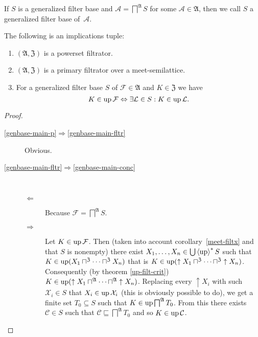 \begin{defn}
If $S$ is a generalized filter base and $\mathcal{A}=\bigsqcap^{\mathfrak{A}}S$
for some $\mathcal{A}\in\mathfrak{A}$, then we call $S$ a generalized
filter base of~$\mathcal{A}$.\end{defn}
\begin{thm}
\label{genbase-main}The following is an implications tuple:
\begin{enumerate}
\item \label{genbase-main-p}$(\mathfrak{A},\mathfrak{Z})$ is a powerset
filtrator.
\item \label{genbase-main-fltr}$(\mathfrak{A},\mathfrak{Z})$ is a primary
filtrator over a meet-semilattice.
\item \label{genbase-main-conc}For a generalized filter base $S$ of $\mathcal{F}\in\mathfrak{A}$
and $K\in\mathfrak{Z}$ we have
\[
K\in\operatorname{up}\mathcal{F}\Leftrightarrow\exists\mathcal{L}\in S:K\in\operatorname{up}\mathcal{L}.
\]

\end{enumerate}
\end{thm}
\begin{proof}
~
\begin{description}
\item [{\ref{genbase-main-p}$\Rightarrow$\ref{genbase-main-fltr}}] Obvious.
\item [{\ref{genbase-main-fltr}$\Rightarrow$\ref{genbase-main-conc}}] ~

\begin{description}
\item [{$\Leftarrow$}] Because $\mathcal{F}=\bigsqcap^{\mathfrak{A}}S$.
\item [{$\Rightarrow$}] Let $K\in\operatorname{up}\mathcal{F}$. Then (taken into account
corollary~\ref{meet-filtx} and that $S$ is nonempty) there exist
$X_{1},\dots,X_{n}\in\bigcup\left\langle \operatorname{up}\right\rangle ^{\ast}S$ such that $K\in\operatorname{up}(X_{1}\sqcap^{\mathfrak{Z}}\dots\sqcap^{\mathfrak{Z}}X_{n})$
that is $K\in\operatorname{up}(\uparrow X_{1}\sqcap^{\mathfrak{Z}}\dots\sqcap^{\mathfrak{Z}}\uparrow X_{n})$.
Consequently (by theorem \ref{up-filt-crit}) $K\in\operatorname{up}(\uparrow X_{1}\sqcap^{\mathfrak{A}}\dots\sqcap^{\mathfrak{A}}\uparrow X_{n})$.
Replacing every $\uparrow X_{i}$ with such $\mathcal{X}_{i}\in S$
that $X_{i}\in\operatorname{up}\mathcal{X}_{i}$ (this is obviously possible to
do), we get a finite set $T_{0}\subseteq S$ such that $K\in\operatorname{up}\bigsqcap^{\mathfrak{A}}T_{0}$.
From this there exists $\mathcal{C}\in S$ such that $\mathcal{C}\sqsubseteq\bigsqcap^{\mathfrak{A}}T_{0}$
and so $K\in\operatorname{up}\mathcal{C}$.
\end{description}
\end{description}
\end{proof}
